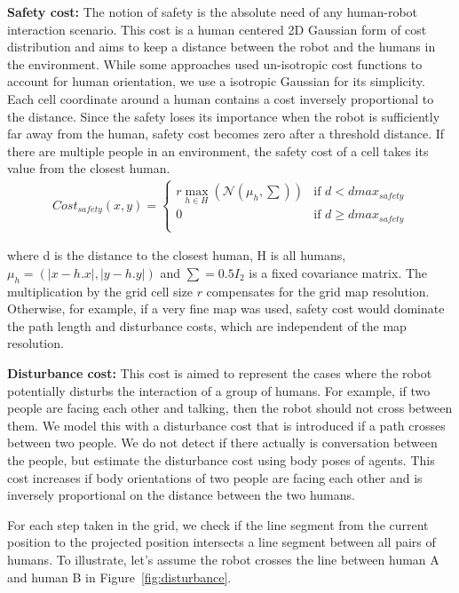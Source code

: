 \textbf{Safety cost:} The notion of safety is the absolute need of any human-robot interaction scenario. This cost is a human centered 2D Gaussian form of cost distribution and aims to keep a distance between the robot and the humans in the environment. While some approaches used un-isotropic cost functions to account for human orientation, we use a isotropic Gaussian for its simplicity. Each cell coordinate around a human contains a cost inversely proportional to the distance. Since the safety loses its importance when the robot is sufficiently far away from the human, safety cost becomes zero after a threshold distance. If there are multiple people in an environment, the safety cost of a cell takes its value from the closest human.
\begin{align}
Cost_{safety}(x,y)=\left\{ \begin{array}{cl}
r\max_{h\in H}(\mathcal{N}(\mu_h,\sum)) & \textrm{if $d<dmax_{safety}$}\\
0 & \textrm{if $d\geq dmax_{safety}$}\\
\end{array}\right.
\end{align}

where d is the distance to the closest human, H is all humans, $\mu_h = (|x - h.x|,|y - h.y|)$ and $\sum = 0.5I_2$ is a fixed covariance matrix. The multiplication by the grid cell size $r$ compensates for the grid map resolution. Otherwise, for example, if a very fine map was used, safety cost would dominate the path length and disturbance costs, which are independent of the map resolution.
 
\textbf{Disturbance cost:} This cost is aimed to represent the cases where the robot potentially disturbs the interaction of a group of humans. For example, if two people are facing each other and talking, then the robot should not cross between them.  We model this with a disturbance cost that is introduced if a path crosses between two people. We do not detect if there actually is conversation between the people, but estimate the disturbance cost using body poses of agents. This cost increases if body orientations of two people are facing each other and is inversely proportional on the distance between the two humans.

For each step taken in the grid, we check if the line segment from the current position to the  projected position intersects a line segment between all pairs of humans. To illustrate, let's assume the robot crosses the line between human A and human B in Figure~\ref{fig:disturbance}. 

